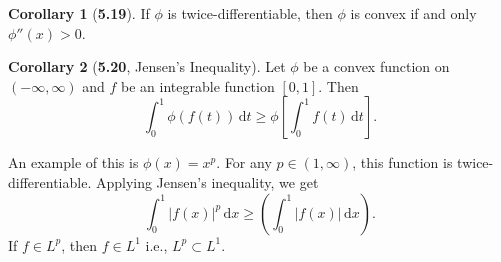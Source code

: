 \documentclass[12pt]{article}
\theoremstyle{definition}
\newtheorem*{cor}{Corollary}
\begin{document}
\begin{cor}[\textbf{5.19}]

    If \( \phi \) is twice-differentiable, then \( \phi \) is convex if and only \( \phi''(x) > 0 \).

\end{cor}

\begin{cor}[\textbf{5.20}, Jensen's Inequality]

    Let \( \phi \) be a convex function on \( (-\infty, \infty) \) and \( f \) be an integrable function \( [0,1] \). Then
        \[
            \int_{0}^{1} \phi(f(t)) \,\mathrm{d} t \geq \phi \left[ \int_{0}^{1} f(t) \,\mathrm{d}t \right].
        \]


\end{cor}

An example of this is \( \phi(x) = x^{p} \). For any \( p \in (1, \infty) \), this function is twice-differentiable. Applying Jensen's inequality, we get
    \[
        \int_{0}^{1} |f(x)|^{p} \, \mathrm{d}x \geq \left( \int_{0}^{1} |f(x)| \, \mathrm{d} x\right).
    \]
If \( f \in L^p \), then \( f \in L^1 \) i.e., \( L^p \subset L^1 \).
\end{document}
